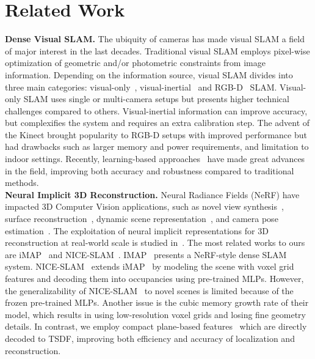 \section{Related Work}

\noindent \textbf{Dense Visual SLAM.} The ubiquity of cameras has made visual SLAM a field of major interest in the last decades. Traditional visual SLAM employs pixel-wise optimization of geometric and/or photometric constraints from image information. Depending on the information source, visual SLAM divides into three main categories: visual-only~\cite{newcombe2011dtam, engel2014lsd, forster2014svo, mur2017orb, Tateno_2017_CVPR, engel2017direct}, visual-inertial~\cite{mourikis2007multi, leutenegger2015keyframe, bloesch2015robust, mur2017visual, qin2018vins, von2018direct} and RGB-D~\cite{newcombe2011kinectfusion, kerl2013dense, endres20133, campos2021orb} SLAM. Visual-only SLAM uses single or multi-camera setups but presents higher technical challenges compared to others. Visual-inertial information can improve accuracy, but complexifies the system and requires an extra calibration step. The advent of the Kinect brought popularity to RGB-D setups with improved performance but had drawbacks such as larger memory and power requirements, and limitation to indoor settings. Recently, learning-based approaches~\cite{bloesch2018codeslam, li2018undeepvo, li2020deepslam, czarnowski2020deepfactors, teed2021droid} have made great advances in the field, improving both accuracy and robustness compared to traditional methods. \\

\noindent\textbf{Neural Implicit 3D Reconstruction.}  Neural Radiance Fields (NeRF) have impacted 3D Computer Vision applications, such as novel view synthesis~\cite{mildenhall2020nerf, martin2021nerf, verbin2022ref, mildenhall2022nerf}, surface reconstruction~\cite{park2019deepsdf, yariv2021volume, oechsle2021unisurf, wang2021neus, zhang2021ners, wang2022neuris, yariv2020multiview}, dynamic scene representation~\cite{gao2021dynamic, park2021nerfies, pumarola2021d, park2021hypernerf}, and camera pose estimation~\cite{yen2021inerf, wang2021nerf, lin2021barf, jeong2021self, xia2022sinerf}. The exploitation of neural implicit representations for 3D reconstruction at real-world scale is studied in~\cite{azinovic2022neural, wang2022go, bozic2021transformerfusion, choe2021volumefusion, murez2020atlas, sun2021neuralrecon, weder2021neuralfusion, yan2021continual, li2022bnv}. The most related works to ours are iMAP~\cite{sucar2021imap} and NICE-SLAM~\cite{zhu2022nice}. IMAP~\cite{sucar2021imap} presents a NeRF-style dense SLAM system. NICE-SLAM~\cite{zhu2022nice} extends iMAP~\cite{sucar2021imap} by modeling the scene with voxel grid features and decoding them into occupancies using pre-trained MLPs. However, the generalizability of NICE-SLAM~\cite{zhu2022nice} to novel scenes is limited because of the frozen pre-trained MLPs. Another issue is the cubic memory growth rate of their model, which results in using low-resolution voxel grids and losing fine geometry details. In contrast, we employ compact plane-based features~\cite{chan2022efficient} which are directly decoded to TSDF, improving both efficiency and accuracy of localization and reconstruction.

